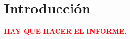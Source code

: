 







\tableofcontents
\newpage

\section{Introducción}
	\begin{center}
		\Huge{\textcolor{red}{\textbf{HAY QUE HACER EL INFORME.}}}
	\end{center}

